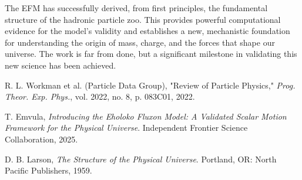 \documentclass[11pt]{article}
\begin{document}
The EFM has successfully derived, from first principles, the fundamental structure of the hadronic particle zoo. This provides powerful computational evidence for the model's validity and establishes a new, mechanistic foundation for understanding the origin of mass, charge, and the forces that shape our universe. The work is far from done, but a significant milestone in validating this new science has been achieved.


\begin{thebibliography}{99}
\raggedright

R. L. Workman et al. (Particle Data Group), "Review of Particle Physics," \textit{Prog. Theor. Exp. Phys.}, vol. 2022, no. 8, p. 083C01, 2022.

T. Emvula, \textit{Introducing the Eholoko Fluxon Model: A Validated Scalar Motion Framework for the Physical Universe}. Independent Frontier Science Collaboration, 2025.

D. B. Larson, \textit{The Structure of the Physical Universe}. Portland, OR: North Pacific Publishers, 1959.

\end{thebibliography}
\end{document}
